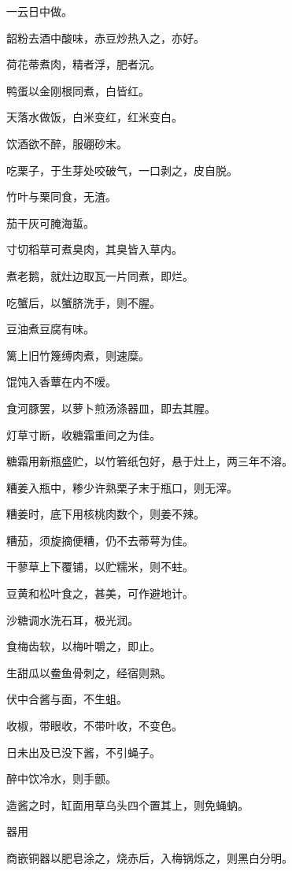 \documentclass[a4paper,12pt,UTF8,twoside]{ctexbook}
\begin{document}
    一云日中做。
    
    韶粉去酒中酸味，赤豆炒热入之，亦好。
    
    荷花蒂煮肉，精者浮，肥者沉。
    
    鸭蛋以金刚根同煮，白皆红。
    
    天落水做饭，白米变红，红米变白。
    
    饮酒欲不醉，服硼砂末。
    
    吃栗子，于生芽处咬破气，一口剥之，皮自脱。
    
    竹叶与栗同食，无渣。
    
    茄干灰可腌海蜇。
    
    寸切稻草可煮臭肉，其臭皆入草内。
    
    煮老鹅，就灶边取瓦一片同煮，即烂。
    
    吃蟹后，以蟹脐洗手，则不腥。
    
    豆油煮豆腐有味。
    
    篱上旧竹篾缚肉煮，则速糜。
    
    馄饨入香蕈在内不嗳。
    
    食河豚罢，以萝卜煎汤涤器皿，即去其腥。
    
    灯草寸断，收糖霜重间之为佳。
    
    糖霜用新瓶盛贮，以竹箬纸包好，悬于灶上，两三年不溶。
    
    糟姜入瓶中，糁少许熟栗子末于瓶口，则无滓。
    
    糟姜时，底下用核桃肉数个，则姜不辣。
    
    糟茄，须旋摘便糟，仍不去蒂萼为佳。
    
    干蓼草上下覆铺，以贮糯米，则不蛀。
    
    豆黄和松叶食之，甚美，可作避地计。
    
    沙糖调水洗石耳，极光润。
    
    食梅齿软，以梅叶嚼之，即止。
    
    生甜瓜以鲞鱼骨刺之，经宿则熟。
    
    伏中合酱与面，不生蛆。
    
    收椒，带眼收，不带叶收，不变色。
    
    日未出及已没下酱，不引蝇子。
    
    醉中饮冷水，则手颤。
    
    造酱之时，缸面用草乌头四个置其上，则免蝇蚋。
    
    器用
    
    商嵌铜器以肥皂涂之，烧赤后，入梅锅烁之，则黑白分明。
    
\end{document}
